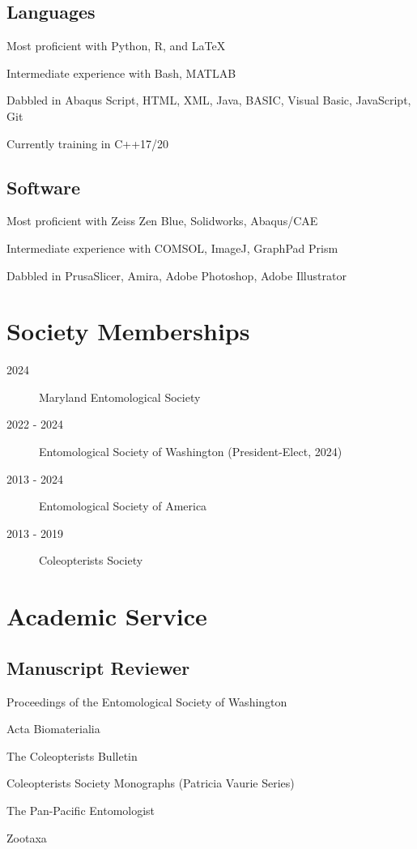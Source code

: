 \documentclass[12pt,a4paper]{article}
\begin{document}
	\subsection*{Languages}
		\begin{description}
			\item Most proficient with Python, R, and \LaTeX
			\item Intermediate experience with Bash, MATLAB
			\item Dabbled in Abaqus Script, HTML, XML, Java, BASIC, Visual Basic, JavaScript, Git
			\item Currently training in C++17/20
		\end{description}
		
	\subsection*{Software}
		\begin{description}
			\item Most proficient with Zeiss Zen Blue, Solidworks, Abaqus/CAE
			\item Intermediate experience with COMSOL, ImageJ, GraphPad Prism
			\item Dabbled in PrusaSlicer, Amira, Adobe Photoshop, Adobe Illustrator
		\end{description}


\section*{Society Memberships}
	\begin{description}
		\item [2024] Maryland Entomological Society
		\item [2022 - 2024]	Entomological Society of Washington (President-Elect, 2024)
		\item [2013 - 2024] Entomological Society of America
		\item [2013 - 2019] Coleopterists Society
	\end{description}

\section*{Academic Service}
	\subsection*{Manuscript Reviewer}
		\begin{description}
			\item Proceedings of the Entomological Society of Washington
			\item Acta Biomaterialia
			\item The Coleopterists Bulletin
			\item Coleopterists Society Monographs (Patricia Vaurie Series)
			\item The Pan-Pacific Entomologist 
			\item Zootaxa
		\end{description}
\end{document}
